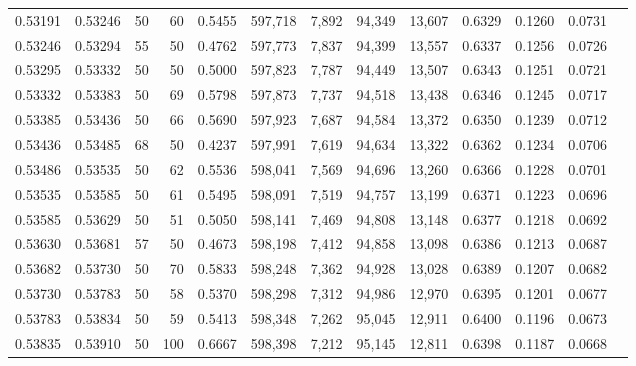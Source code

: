 \begin{tabular}{rrrrrrrrrrrrr}
0.53191 & 0.53246 &    50 &  60 &                                     0.5455 & 597,718 &   7,892 &  94,349 &  13,607 & 0.6329 & 0.1260 & 0.0731 \\
0.53246 & 0.53294 &    55 &  50 &                                     0.4762 & 597,773 &   7,837 &  94,399 &  13,557 & 0.6337 & 0.1256 & 0.0726 \\
0.53295 & 0.53332 &    50 &  50 &                                     0.5000 & 597,823 &   7,787 &  94,449 &  13,507 & 0.6343 & 0.1251 & 0.0721 \\
0.53332 & 0.53383 &    50 &  69 &                                     0.5798 & 597,873 &   7,737 &  94,518 &  13,438 & 0.6346 & 0.1245 & 0.0717 \\
0.53385 & 0.53436 &    50 &  66 &                                     0.5690 & 597,923 &   7,687 &  94,584 &  13,372 & 0.6350 & 0.1239 & 0.0712 \\
0.53436 & 0.53485 &    68 &  50 &                                     0.4237 & 597,991 &   7,619 &  94,634 &  13,322 & 0.6362 & 0.1234 & 0.0706 \\
0.53486 & 0.53535 &    50 &  62 &                                     0.5536 & 598,041 &   7,569 &  94,696 &  13,260 & 0.6366 & 0.1228 & 0.0701 \\
0.53535 & 0.53585 &    50 &  61 &                                     0.5495 & 598,091 &   7,519 &  94,757 &  13,199 & 0.6371 & 0.1223 & 0.0696 \\
0.53585 & 0.53629 &    50 &  51 &                                     0.5050 & 598,141 &   7,469 &  94,808 &  13,148 & 0.6377 & 0.1218 & 0.0692 \\
0.53630 & 0.53681 &    57 &  50 &                                     0.4673 & 598,198 &   7,412 &  94,858 &  13,098 & 0.6386 & 0.1213 & 0.0687 \\
0.53682 & 0.53730 &    50 &  70 &                                     0.5833 & 598,248 &   7,362 &  94,928 &  13,028 & 0.6389 & 0.1207 & 0.0682 \\
0.53730 & 0.53783 &    50 &  58 &                                     0.5370 & 598,298 &   7,312 &  94,986 &  12,970 & 0.6395 & 0.1201 & 0.0677 \\
0.53783 & 0.53834 &    50 &  59 &                                     0.5413 & 598,348 &   7,262 &  95,045 &  12,911 & 0.6400 & 0.1196 & 0.0673 \\
0.53835 & 0.53910 &    50 & 100 &                                     0.6667 & 598,398 &   7,212 &  95,145 &  12,811 & 0.6398 & 0.1187 & 0.0668 \\

\end{tabular}
